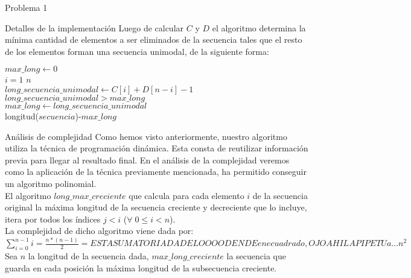 \begin{section}{Problema 1}
\begin{subsection}{Detalles de la implementación}
		Luego de calcular $C$ y $D$ el algoritmo determina la mínima cantidad de elementos a ser eliminados de
		la secuencia tales que el resto de los elementos forman una secuencia unimodal, de la siguiente forma:
		
		\vspace{0.5cm}
		\begin{pseudo}
			\tab $max\_long \leftarrow 0$ \\
			\tab \FOR $i=1$ \TO $n$ \\
			\tab \tab $long\_secuencia\_unimodal\leftarrow C[i]+D[n-i]-1$ \\
			\tab \tab \IF $ long\_secuencia\_unimodal >  max\_long$ \\
			\tab \tab \tab $max\_long \leftarrow long\_secuencia\_unimodal$ \\
			\tab \RET longitud($secuencia$)-$max\_long$
		\end{pseudo}

	\end{subsection}


	\begin{subsection}{Análisis de complejidad}
	Como hemos visto anteriormente, nuestro algoritmo utiliza la técnica de programación dinámica. Esta consta de reutilizar información previa para llegar al resultado final. En el análisis de la complejidad veremos como la aplicación de la técnica previamente mencionada, ha permitido conseguir un algoritmo polinomial.\\
	
	El algoritmo $long\_max\_creciente$ que calcula para cada elemento $i$ de la secuencia original la máxima longitud de la secuencia creciente y decreciente que lo incluye, itera por todos los índices $j<i$ ($\forall\; 0 \leq i < n$).\\

	La complejidad de dicho algoritmo viene dada por: $\sum_{i=0}^{n-1} i = \frac{n*(n-1)}{2} = ESTA SUMATORIA DA DEL OOOODEN DE ene cuadrado, OJO AHI LA PIPETUa... n^2$\\

	Sea $n$ la longitud de la secuencia dada, $max\_long\_creciente$ la secuencia que guarda en cada posición la máxima longitud de la subsecuencia creciente.\\


\end{subsection}
\end{section}
